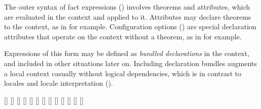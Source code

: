 \begin{isabellebody}
\begin{isamarkuptext}
  The outer syntax of fact expressions () involves
  theorems and attributes, which are evaluated in the context and
  applied to it.  Attributes may declare theorems to the context, as
  in  for example.
  Configuration options () are special declaration
  attributes that operate on the context without a theorem, as in
   for example.

  Expressions of this form may be defined as \emph{bundled
  declarations} in the context, and included in other situations later
  on.  Including declaration bundles augments a local context casually
  without logical dependencies, which is in contrast to locales and
  locale interpretation ().

  \begin{railoutput}
[]
\rail@bar
{}
[]
\rail@endbar
{}
[]
[]
[]
\rail@bar
{}
[]
\rail@plus
{}[]
[]
\rail@endplus
\rail@endbar
\rail@end
{}
\rail@bar
{}[]
[]
\rail@endbar
\rail@plus
{}[]
\rail@endplus
\rail@end
{}
[]
\rail@plus
{}[]
\rail@endplus
\rail@end
\end{railoutput}



\end{isamarkuptext}
\end{isabellebody}
